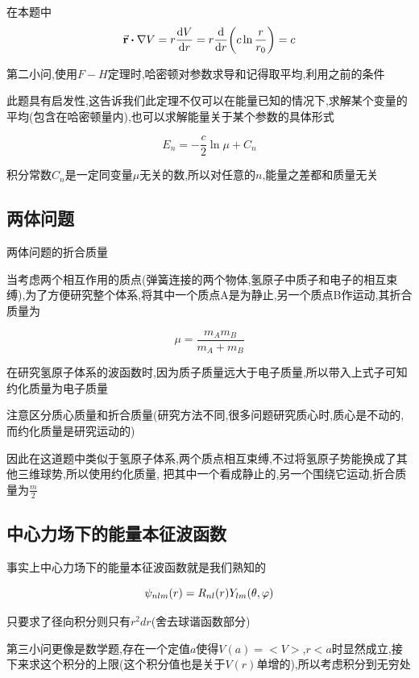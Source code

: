 \documentclass{article}
\begin{document}
            在本题中
            $$ \va{r} \vdot \nabla V = r \dv{V}{r} = r \dv{r}(c \ln{\frac{r}{r_{0}}}) = c  $$

            第二小问,使用$F-H$定理时,哈密顿对参数求导和记得取平均,利用之前的条件

            此题具有启发性,这告诉我们此定理不仅可以在能量已知的情况下,求解某个变量的平均(包含在哈密顿量内),也可以求解能量关于某个参数的具体形式

            $$ E_{n} = - \frac{c}{2} \ln{\mu} + C_{n} $$
            
            积分常数$C_{n}$是一定同变量$\mu$无关的数,所以对任意的$n$,能量之差都和质量无关

        \subsection{两体问题}
            \begin{formal}
                两体问题的折合质量

                当考虑两个相互作用的质点(弹簧连接的两个物体,氢原子中质子和电子的相互束缚),为了方便研究整个体系,将其中一个质点A是为静止,另一个质点B作运动,其折合质量为
                
                $$ \mu = \dfrac{m_{A}m_{B}}{m_{A}+m_{B}} $$

                在研究氢原子体系的波函数时,因为质子质量远大于电子质量,所以带入上式子可知约化质量为电子质量

                注意区分质心质量和折合质量(研究方法不同,很多问题研究质心时,质心是不动的,而约化质量是研究运动的)

                因此在这道题中类似于氢原子体系,两个质点相互束缚,不过将氢原子势能换成了其他三维球势,所以使用约化质量,
                把其中一个看成静止的,另一个围绕它运动,折合质量为$\frac{m}{2}$
            \end{formal}
 


        \subsection{中心力场下的能量本征波函数}
            事实上中心力场下的能量本征波函数就是我们熟知的
            
                $$ \psi_{nlm} (r) = R_{nl}(r) Y_{lm}(\theta,\varphi) $$

            只要求了径向积分则只有$r^{2}dr$(舍去球谐函数部分)

            第三小问更像是数学题,存在一个定值$a$使得$V(a) = < V >$,$r<a$时显然成立,接下来求这个积分的上限(这个积分值也是关于$V(r)$单增的),所以考虑积分到无穷处
\end{document}
